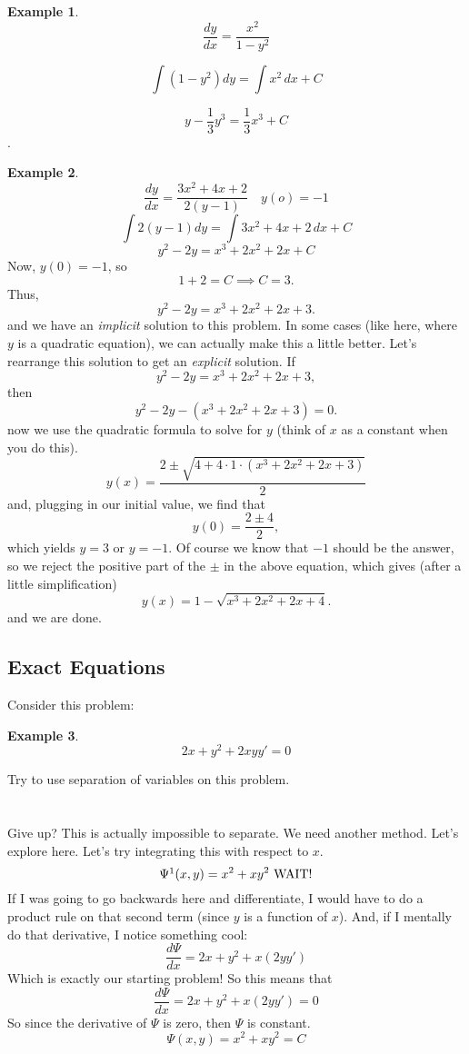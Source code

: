 \documentclass[a5paper]{article}
\theoremstyle{definition}%
\newtheorem*{example*}{Example}
\numberwithin{exercise}{section}
\theoremstyle{remark}%
\begin{document}
\begin{example*}
$$\frac{dy}{dx}=\frac{x^2}{1-y^2}$$

$$\int (1-y^2)dy = \int	x^2 \, dx +C$$

$$y-\frac{1}{3}y^3=\frac{1}{3}x^3 +C$$.

\end{example*}

\begin{example*}
$$\frac{dy}{dx}=\frac{3x^2+4x+2}{2(y-1)}\quad y(o)=-1$$
$$\int 2(y-1) dy=\int 3x^2+4x+2 \, dx + C$$
$$ y^2-2y =x^3+2x^2+2x + C$$	
Now, $y(0)=-1$, so 
$$1+2=C \implies C=3.$$
Thus, 
$$ y^2-2y =x^3+2x^2+2x+3.$$	
and we have an \emph{implicit} solution to this problem. In some cases (like here, where $y$ is a quadratic equation), we can actually make this a little better. Let's rearrange this solution to get an \emph{explicit} solution. If 
$$ y^2-2y =x^3+2x^2+2x+3,$$	
then 
$$ y^2-2y -(x^3+2x^2+2x+3)=0.$$	
now we use the quadratic formula to solve for $y$ (think of $x$ as a constant when you do this). 
$$y(x)=\frac{2\pm\sqrt{4+4\cdot1\cdot(x^3+2x^2+2x+3)}}{2}$$
and, plugging in our initial value, we find that 
$$y(0)=\frac{2\pm4}{2},$$ 
which yields $y=3$ or $y=-1$. Of course we know that $-1$ should be the answer, so we reject the positive part of the $\pm$ in the above equation, which gives (after a little simplification)
$$y(x)=1-\sqrt{x^3+2x^2+2x+4}.$$
and we are done. 
\end{example*}

\subsection[2.6]{Exact Equations}

Consider this problem:
\begin{example*}
$$2x+y^2+2xyy'=0$$
\end{example*}
Try to use separation of variables on this problem. \\
\\
\\
Give up? This is actually impossible to separate. We need another method. Let's explore here. Let's try integrating this with respect to $x$. 
$$\Psi\footnotemark(x,y)=x^2+xy^2 \text{  WAIT!}$$
If I was going to go backwards here and differentiate, I would have to do a product rule on that second term (since $y$ is a function of $x$). And, if I mentally do that derivative, I notice something cool:
$$\frac{d\Psi}{dx}=2x+y^2+x(2yy')$$
Which is exactly our starting problem! So this means that 
$$\frac{d\Psi}{dx}=2x+y^2+x(2yy')=0$$
So since the derivative of $\Psi$ is zero, then $\Psi$ is constant. 
$$\Psi(x,y)=x^2+xy^2=C$$
\end{document}
